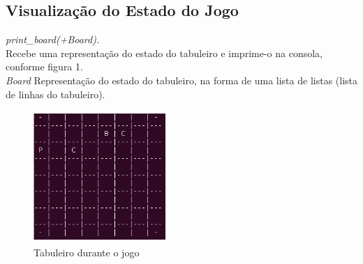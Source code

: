 \documentclass[15pt,a4paper]{article}
\begin{document}
\subsection{Visualização do Estado do Jogo}
\textit{print\_board(+Board).}\\
Recebe uma representação do estado do tabuleiro e imprime-o na consola, conforme figura 1.\\
\textit{Board} Representação do estado do tabuleiro, na forma de uma lista de listas (lista de linhas do tabuleiro).\\
\begin{figure}[h!]
\begin{center}
\includegraphics[height=5cm,width=5cm]{tabuleiro_meio.png}
\caption{Tabuleiro durante o jogo}
\label{fig:tabuleiro_meio}
\end{center}
\end{figure}
\end{document}
